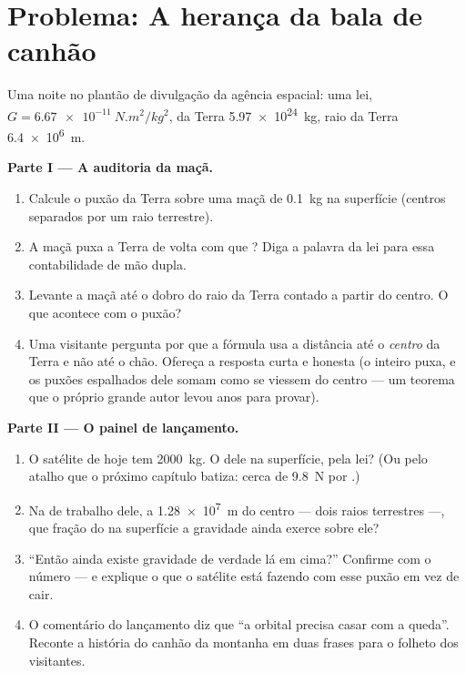 \section{Problema: A herança da bala de canhão}

\begin{problem}\label{pb:g9:gravitation:1}
Uma noite no plantão de divulgação da agência espacial: uma lei,
$G = \qty{6.67e-11}{N.m^2/kg^2}$,  da Terra \qty{5.97e24}{kg},
raio da Terra \qty{6.4e6}{m}.

\medskip\noindent\textbf{Parte I --- A auditoria da maçã.}
\begin{enumerate}
  \item Calcule o puxão da Terra sobre uma maçã de \qty{0.1}{kg} na
        superfície (centros separados por um raio terrestre).
  \item A maçã puxa a Terra de volta com que ? Diga a palavra da
        lei para essa contabilidade de mão dupla.
  \item Levante a maçã até o dobro do raio da Terra contado a partir
        do centro. O que acontece com o puxão?
  \item Uma visitante pergunta por que a fórmula usa a distância até
        o \emph{centro} da Terra e não até o chão. Ofereça a resposta
        curta e honesta (o  inteiro puxa, e os puxões
        espalhados dele somam como se viessem do centro --- um
        teorema que o próprio grande autor levou anos para provar).
\end{enumerate}

\medskip\noindent\textbf{Parte II --- O painel de lançamento.}
\begin{enumerate}[resume]
  \item O satélite de hoje tem \qty{2000}{kg}. O  dele na
        superfície, pela lei? (Ou pelo atalho que o próximo capítulo
        batiza: cerca de \qty{9.8}{N} por .)
  \item Na  de trabalho dele, a \qty{1.28e7}{m} do centro ---
        dois raios terrestres ---, que fração do  na superfície a
        gravidade ainda exerce sobre ele?
  \item ``Então ainda existe gravidade de verdade lá em cima?''
        Confirme com o número --- e explique o que o satélite está
        fazendo com esse puxão em vez de cair.
  \item O comentário do lançamento diz que ``a  orbital
        precisa casar com a queda''. Reconte a história do canhão da
        montanha em duas frases para o folheto dos visitantes.
\end{enumerate}


\end{problem}
